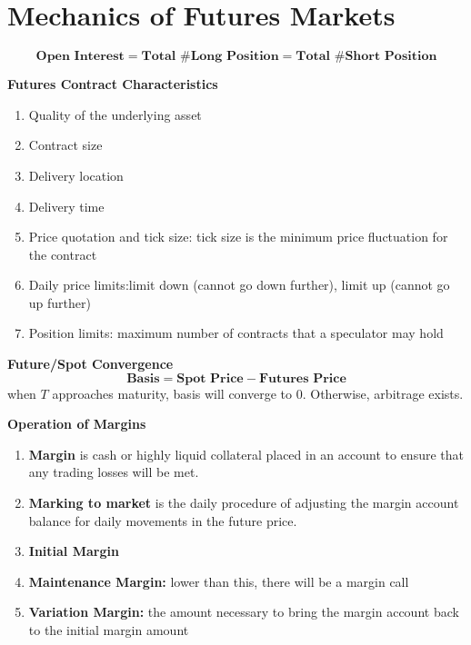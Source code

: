 \documentclass[11pt,fleqn]{book} %
\numberwithin{equation}{section} %
\numberwithin{figure}{section} %
\numberwithin{table}{section} %
\begin{document}
\chapter{Mechanics of Futures Markets}
$$
\textbf{Open Interest}=\textbf{Total \# Long Position}=\textbf{Total \# Short Position}
$$
\begin{definition}\textbf{Futures Contract Characteristics}
\begin{enumerate}
    \item Quality of the underlying asset
    \item Contract size
    \item Delivery location
    \item Delivery time
    \item Price quotation and tick size: tick size is the minimum price fluctuation for the contract
    \item Daily price limits:limit down (cannot go down further), limit up (cannot go up further)
    \item Position limits: maximum number of contracts that a speculator may hold
\end{enumerate}
\end{definition}
\begin{theorem}\textbf{Future/Spot Convergence}\\
$$
\textbf{Basis}=\textbf{Spot Price}-\textbf{Futures Price}
$$
when $T$ approaches maturity, basis will converge to $0$. Otherwise, arbitrage exists.
\end{theorem}
\begin{definition}\textbf{Operation of Margins}
\begin{enumerate}
    \item \textbf{Margin} is cash or highly liquid collateral placed in an account to ensure that any trading losses will be met.
    \item \textbf{Marking to market} is the daily procedure of adjusting the margin account balance for daily movements in the future price.
    \item \textbf{Initial Margin}
    \item \textbf{Maintenance Margin:} lower than this, there will be a margin call
    \item \textbf{Variation Margin:} the amount necessary to bring the margin account back to the initial margin amount
\end{enumerate}
\end{definition}
\end{document}
